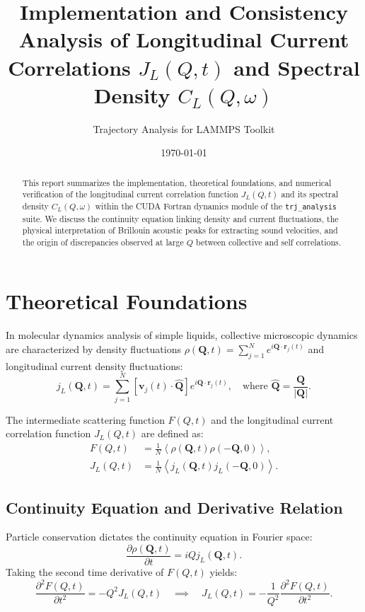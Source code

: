 \documentclass[11pt,a4paper]{article}
\title{\textbf{Implementation and Consistency Analysis of Longitudinal Current Correlations $J_L(Q,t)$ and Spectral Density $C_L(Q,\omega)$}}
\author{Trajectory Analysis for LAMMPS Toolkit}
\date{\today}
\begin{document}
\maketitle

\begin{abstract}
This report summarizes the implementation, theoretical foundations, and numerical verification of the longitudinal current correlation function $J_L(Q,t)$ and its spectral density $C_L(Q,\omega)$ within the CUDA Fortran dynamics module of the \texttt{trj\_analysis} suite. We discuss the continuity equation linking density and current fluctuations, the physical interpretation of Brillouin acoustic peaks for extracting sound velocities, and the origin of discrepancies observed at large $Q$ between collective and self correlations.
\end{abstract}

\section{Theoretical Foundations}

In molecular dynamics analysis of simple liquids, collective microscopic dynamics are characterized by density fluctuations $\rho(\mathbf{Q},t) = \sum_{j=1}^N e^{i \mathbf{Q} \cdot \mathbf{r}_j(t)}$ and longitudinal current density fluctuations:
\begin{equation}
j_L(\mathbf{Q},t) = \sum_{j=1}^N \left[ \mathbf{v}_j(t) \cdot \hat{\mathbf{Q}} \right] e^{i \mathbf{Q} \cdot \mathbf{r}_j(t)}, \quad \text{where } \hat{\mathbf{Q}} = \frac{\mathbf{Q}}{|\mathbf{Q}|}.
\end{equation}

The intermediate scattering function $F(Q,t)$ and the longitudinal current correlation function $J_L(Q,t)$ are defined as:
\begin{align}
F(Q,t) &= \frac{1}{N} \left\langle \rho(\mathbf{Q},t) \rho(-\mathbf{Q},0) \right\rangle, \\
J_L(Q,t) &= \frac{1}{N} \left\langle j_L(\mathbf{Q},t) j_L(-\mathbf{Q},0) \right\rangle.
\end{align}

\subsection{Continuity Equation and Derivative Relation}
Particle conservation dictates the continuity equation in Fourier space:
\begin{equation}
\frac{\partial \rho(\mathbf{Q},t)}{\partial t} = i Q j_L(\mathbf{Q},t).
\end{equation}
Taking the second time derivative of $F(Q,t)$ yields:
\begin{equation}
\frac{\partial^2 F(Q,t)}{\partial t^2} = - Q^2 J_L(Q,t) \quad \implies \quad J_L(Q,t) = -\frac{1}{Q^2} \frac{\partial^2 F(Q,t)}{\partial t^2}.
\end{equation}
\end{document}
